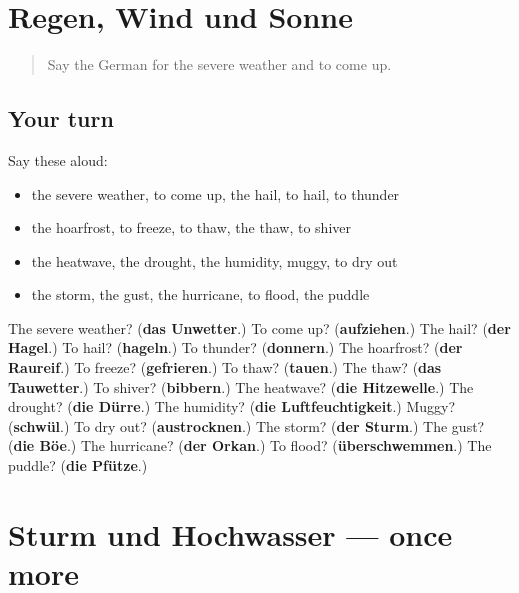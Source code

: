 \section[(dialogue)]{Regen, Wind und Sonne}

\label{lesson:GE-R465-review-462-465}



\begin{quote}
Say the German for the severe weather and to come up.
\end{quote}

\subsection*{Your turn}
Say these aloud:

\begin{itemize}
\raggedright
  \item the severe weather, to come up, the hail, to hail, to thunder
  \item the hoarfrost, to freeze, to thaw, the thaw, to shiver
  \item the heatwave, the drought, the humidity, muggy, to dry out
  \item the storm, the gust, the hurricane, to flood, the puddle
\end{itemize}

\begin{tcolorbox}[breakable,colback=teal!4,colframe=teal!35!black,title={Before you move on}]
The severe weather? (\textbf{das Unwetter}.) To come up? (\textbf{aufziehen}.) The hail? (\textbf{der Hagel}.) To hail? (\textbf{hageln}.) To thunder? (\textbf{donnern}.) The hoarfrost? (\textbf{der Raureif}.) To freeze? (\textbf{gefrieren}.) To thaw? (\textbf{tauen}.) The thaw? (\textbf{das Tauwetter}.) To shiver? (\textbf{bibbern}.) The heatwave? (\textbf{die Hitzewelle}.) The drought? (\textbf{die Dürre}.) The humidity? (\textbf{die Luftfeuchtigkeit}.) Muggy? (\textbf{schwül}.) To dry out? (\textbf{austrocknen}.) The storm? (\textbf{der Sturm}.) The gust? (\textbf{die Böe}.) The hurricane? (\textbf{der Orkan}.) To flood? (\textbf{überschwemmen}.) The puddle? (\textbf{die Pfütze}.)
\end{tcolorbox}
\section[(dialogue)]{Sturm und Hochwasser — once more}

\label{lesson:GE-R465-review-final-465}



